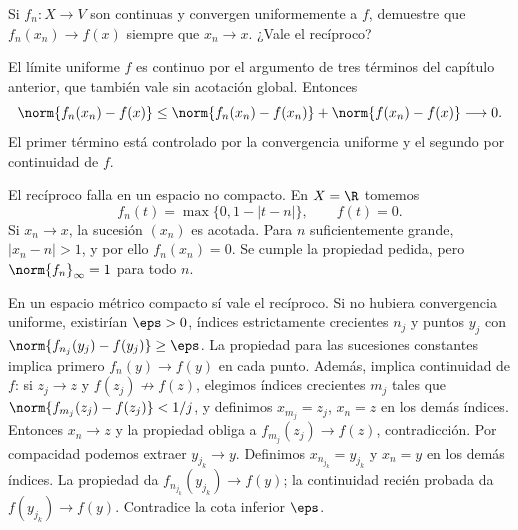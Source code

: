 \begin{ejercicio}
Si $f_n:X\to V$ son continuas y convergen uniformemente a $f$, demuestre que $f_n(x_n)\to f(x)$ siempre que $x_n\to x$. ¿Vale el recíproco?
\end{ejercicio}
\begin{solucion}
El límite uniforme $f$ es continuo por el argumento de tres términos del capítulo anterior, que también vale sin acotación global. Entonces
\[
 \norm{f_n(x_n)-f(x)}
 \le\norm{f_n(x_n)-f(x_n)}+\norm{f(x_n)-f(x)}\longrightarrow0.
\]
El primer término está controlado por la convergencia uniforme y el segundo por continuidad de $f$.

El recíproco falla en un espacio no compacto. En $X=\R$ tomemos
\[
 f_n(t)=\max\{0,1-|t-n|\},\qquad f(t)=0.
\]
Si $x_n\to x$, la sucesión $(x_n)$ es acotada. Para $n$ suficientemente grande, $|x_n-n|>1$, y por ello $f_n(x_n)=0$. Se cumple la propiedad pedida, pero $\norm{f_n}_\infty=1$ para todo $n$.

En un espacio métrico compacto sí vale el recíproco. Si no hubiera convergencia uniforme, existirían $\eps>0$, índices estrictamente crecientes $n_j$ y puntos $y_j$ con $\norm{f_{n_j}(y_j)-f(y_j)}\ge\eps$. La propiedad para las sucesiones constantes implica primero $f_n(y)\to f(y)$ en cada punto. Además, implica continuidad de $f$: si $z_j\to z$ y $f(z_j)\not\to f(z)$, elegimos índices crecientes $m_j$ tales que $\norm{f_{m_j}(z_j)-f(z_j)}<1/j$, y definimos $x_{m_j}=z_j$, $x_n=z$ en los demás índices. Entonces $x_n\to z$ y la propiedad obliga a $f_{m_j}(z_j)\to f(z)$, contradicción. Por compacidad podemos extraer $y_{j_k}\to y$. Definimos $x_{n_{j_k}}=y_{j_k}$ y $x_n=y$ en los demás índices. La propiedad da $f_{n_{j_k}}(y_{j_k})\to f(y)$; la continuidad recién probada da $f(y_{j_k})\to f(y)$. Contradice la cota inferior $\eps$.
\end{solucion}

